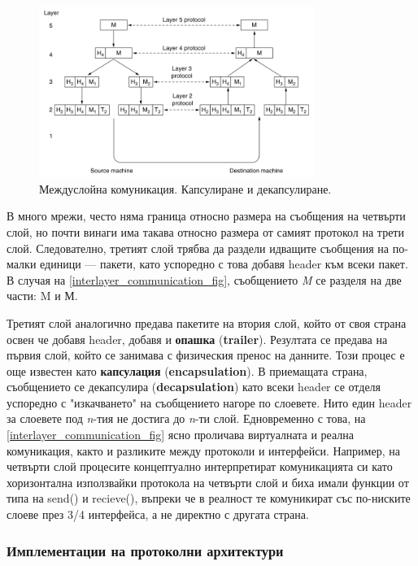 \documentclass[12pt,a4paper,oneside]{book}
\begin{document}
\begin{figure}[h!]
  \centering
  \includegraphics[width=0.8\textwidth]{figures/interlayer_communication.png}
  \caption{Междуслойна комуникация. Капсулиране и декапсулиране.}
  \label{interlayer_communication_fig}
\end{figure}

В много мрежи, често няма граница относно размера на съобщения на четвърти слой,
но почти винаги има такава относно размера от самият протокол на трети слой.
Следователно, третият слой трябва да раздели идващите съобщения на по-малки
единици --- пакети, като успоредно с това добавя header към всеки пакет. В
случая на \autoref{interlayer_communication_fig}, съобщението \textit{M} се
разделя на две части: M и М.

Третият слой аналогично предава пакетите на втория слой, който от своя страна
освен че добавя header, добавя и \textbf{опашка} (\textbf{trailer}). Резултата
се предава на първия слой, който се занимава с физическия пренос на данните.
Този процес е още известен като \textbf{капсулация} (\textbf{encapsulation}). В
приемащата страна, съобщението се декапсулира (\textbf{decapsulation}) като
всеки header се отделя успоредно с "изкачването" на съобщението нагоре по
слоевете. Нито един header за слоевете под \textit{n}-тия не достига до
\textit{n}-ти слой. Едновременно с това, на
\autoref{interlayer_communication_fig} ясно проличава виртуалната и реална
комуникация, както и разликите между протоколи и интерфейси. Например, на
четвърти слой процесите концептуално интерпретират комуникацията си като
хоризонтална използвайки протокола на четвърти слой и биха имали функции от типа
на send() и recieve(), въпреки че в реалност те комуникират със по-ниските
слоеве през 3/4 интерфейса, а не директно с другата страна.

\vfill

\subsubsection{Имплементации на протоколни архитектури}
\end{document}

